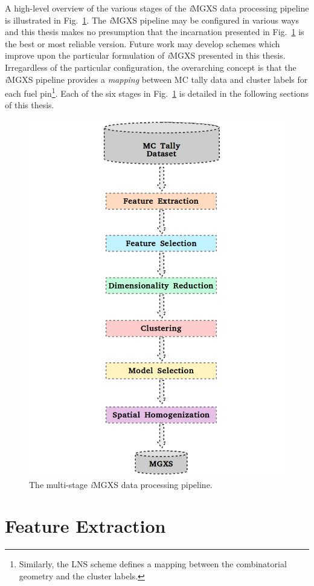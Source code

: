 A high-level overview of the various stages of the \textit{i}\ac{MGXS} data processing pipeline is illustrated in Fig.~\ref{fig:chap10-pipeline}. The \textit{i}\ac{MGXS} pipeline may be configured in various ways and this thesis makes no presumption that the incarnation presented in Fig.~\ref{fig:chap10-pipeline} is the best or most reliable version. Future work may develop schemes which improve upon the particular formulation of \textit{i}\ac{MGXS} presented in this thesis. Irregardless of the particular configuration, the overarching concept is that the \textit{i}\ac{MGXS} pipeline provides a \textit{mapping} between \ac{MC} tally data and cluster labels for each fuel pin\footnote{Similarly, the \ac{LNS} scheme defines a mapping between the combinatorial geometry and the cluster labels.}. Each of the six stages in Fig.~\ref{fig:chap10-pipeline} is detailed in the following sections of this thesis.

\begin{figure}[h!]
\centering
\includegraphics[width=0.655\linewidth]{figures/unsupervised/pipeline}
\vspace{2mm}
\caption[MGXS pipeline]{The multi-stage \textit{i}\ac{MGXS} data processing pipeline.}
\label{fig:chap10-pipeline}
\end{figure}


\section{Feature Extraction}
\label{sec:chap10-feature-extract}

